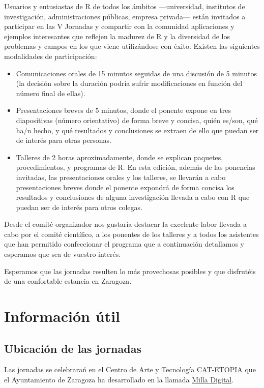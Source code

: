 Usuarios y entusiastas de R de todos los ámbitos —universidad,
institutos de investigación, administraciones públicas, empresa
privada— están invitados a participar en las V Jornadas y compartir
con la comunidad aplicaciones y ejemplos interesantes que reflejen la
madurez de R y la diversidad de los problemas y campos en los que
viene utilizándose con éxito. Existen las siguientes modalidades de
participación:
\begin{itemize}
\item Comunicaciones orales de 15 minutos seguidas de una discusión de
  5 minutos (la decisión sobre la duración podría sufrir
  modificaciones en función del número final de ellas).

\item Presentaciones breves de 5 minutos, donde el ponente expone en
  tres diapositivas (número orientativo) de forma breve y concisa,
  quién es/son, qué ha/n hecho, y qué resultados y conclusiones se
  extraen de ello que puedan ser de interés para otras personas.

\item Talleres de 2 horas aproximadamente, donde se explican paquetes,
  procedimientos, y programas de R.  En esta edición, además de las
  ponencias invitadas, las presentaciones orales y los talleres, se
  llevarán a cabo presentaciones breves donde el ponente expondrá de
  forma concisa los resultados y conclusiones de alguna investigación
  llevada a cabo con R que puedan ser de interés para otros colegas.
\end{itemize}

Desde el comité organizador nos gustaría destacar la excelente labor
llevada a cabo por el comité científico, a los ponentes de los
talleres y a todos los asistentes que han permitido confeccionar el
programa que a continuación detallamos y esperamos que sea de vuestro
interés.

Esperamos que las jornadas resulten lo más provechosas posibles y que
disfrutéis de una confortable estancia en Zaragoza.


\chapter{Información útil}

\section{Ubicación de las jornadas}

Las jornadas se celebrarań en el Centro de Arte y Tecnología 
\href{http://www.zaragoza.es/ciudad/idezar/detalle_Centro?id=5105}{CAT-ETOPIA}
que  el Ayuntamiento de Zaragoza ha desarrollado en la llamada 
\href{http://www.milladigital.es/espanol/home.php}{Milla Digital}. 

